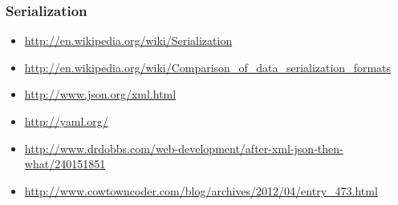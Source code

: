 \subsubsection*{Serialization}

\begin{itemize}
\item \url{http://en.wikipedia.org/wiki/Serialization}
\item \url{http://en.wikipedia.org/wiki/Comparison_of_data_serialization_formats}
\item \url{http://www.json.org/xml.html}
\item \url{http://yaml.org/}
\item \url{http://www.drdobbs.com/web-development/after-xml-json-then-what/240151851}
\item \url{http://www.cowtowncoder.com/blog/archives/2012/04/entry_473.html}
\end{itemize}



